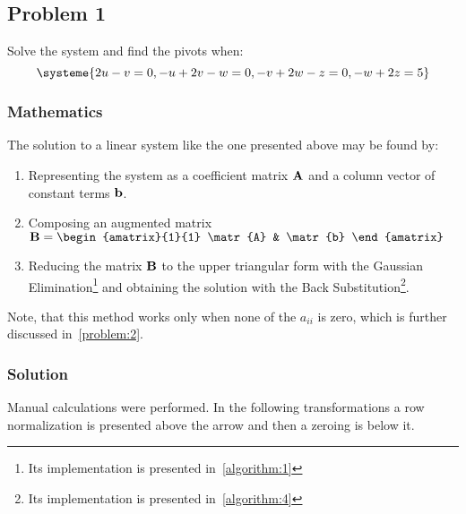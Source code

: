 \subsection{Problem 1}

Solve the system and find the pivots when:
\begin{equation*}
    \systeme{2u-v=0,-u+2v-w=0,-v+2w-z=0,-w+2z=5}
\end{equation*}

\subsubsection*{Mathematics}
The solution to a linear system like the one presented above may be found by:
\begin{enumerate}
  \item Representing the system as a coefficient matrix $\mathbf{A}$ and a column vector
    of constant terms $\mathbf{b}$.
  \item Composing an augmented matrix
    $\matr{B} = \begin{amatrix}{1}{1}
      \matr{A} & \matr{b}
    \end{amatrix}$
  \item Reducing the matrix $\mathbf{B}$ to the upper triangular form with the Gaussian
    Elimination\footnote{Its implementation is presented in~\ref{algorithm:1}} and
    obtaining the solution with the Back Substitution\footnote{Its implementation is presented in~\ref{algorithm:4}}.
\end{enumerate}

Note, that this method works only when none of the $a_{ii}$ is zero, which is further
discussed in~\ref{problem:2}.

\subsubsection*{Solution}

Manual calculations were performed. In the following transformations a row
normalization is presented above the arrow and then a zeroing is below it.


